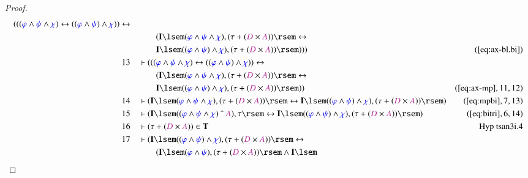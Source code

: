\begin{proof}
\begin{align}
     (
      ( ( \mw{\varphi} \wedge \mw{\psi} \wedge \mw{\chi} )
      \leftrightarrow ( ( \mw{\varphi} \wedge \mw{\psi} )
      \wedge \mw{\chi} ) ) \leftrightarrow  \notag \\ & & & \qquad
     ( \mathbf{I}
      \lsem ( \mw{\varphi} \wedge \mw{\psi} \wedge
      \mw{\chi} ) , ( \tau + ( \mc{D} \times \mc{A} ) )
      \rsem \leftrightarrow  \notag \\ & & & \qquad
     \mathbf{I} \lsem ( (
      \mw{\varphi} \wedge \mw{\psi} ) \wedge \mw{\chi} ) ,
      ( \tau + ( \mc{D} \times \mc{A} ) ) \rsem ) )
      )&(\mbox{\ref{eq:ax-bl.bi}})\notag
  \\ 13 &&  & \vdash ( ( ( \mw{\varphi} \wedge \mw{\psi} \wedge \mw{\chi} )
      \leftrightarrow ( ( \mw{\varphi} \wedge \mw{\psi} )
      \wedge \mw{\chi} ) ) \leftrightarrow  \notag \\ & & & \qquad
     ( \mathbf{I}
      \lsem ( \mw{\varphi} \wedge \mw{\psi} \wedge
      \mw{\chi} ) , ( \tau + ( \mc{D} \times \mc{A} ) )
      \rsem \leftrightarrow \notag \\ & & & \qquad
      \mathbf{I} \lsem ( (
      \mw{\varphi} \wedge \mw{\psi} ) \wedge \mw{\chi} ) ,
      ( \tau + ( \mc{D} \times \mc{A} ) ) \rsem )
      )&(\mbox{\ref{eq:ax-mp}},11,12)\notag
  \\ 14 &&  & \vdash ( \mathbf{I} \lsem ( \mw{\varphi} \wedge \mw{\psi} \wedge
      \mw{\chi} ) , ( \tau + ( \mc{D} \times \mc{A} ) )
      \rsem \leftrightarrow \mathbf{I} \lsem ( (
      \mw{\varphi} \wedge \mw{\psi} ) \wedge \mw{\chi} ) ,
      ( \tau + ( \mc{D} \times \mc{A} ) ) \rsem
      )&(\mbox{\ref{eq:mpbi}},7,13)\notag
  \\ 15 &&  & \vdash ( \mathbf{I} \lsem ( ( \mw{\varphi} \wedge \mw{\psi}
      \wedge \mw{\chi} ) ~\string^~ \mc{A} ) , \tau \rsem
      \leftrightarrow \mathbf{I} \lsem ( ( \mw{\varphi}
      \wedge \mw{\psi} ) \wedge \mw{\chi} ) , ( \tau + (
      \mc{D} \times \mc{A} ) ) \rsem
      )&(\mbox{\ref{eq:bitri}},6,14)\notag
  \\ 16 &&  & \vdash ( \tau + ( \mc{D} \times \mc{A} ) ) \in
      \mathbf{T}&\text{Hyp~tsan3i.4}\notag%
  \\ 17 &&  & \vdash ( \mathbf{I} \lsem ( ( \mw{\varphi} \wedge \mw{\psi} )
      \wedge \mw{\chi} ) , ( \tau + ( \mc{D} \times \mc{A} )
      ) \rsem \leftrightarrow \notag \\ & & & \qquad
      ( \mathbf{I} \lsem (
      \mw{\varphi} \wedge \mw{\psi} ) , ( \tau + ( \mc{D}
      \times \mc{A} ) ) \rsem \wedge \mathbf{I} \lsem

\end{align}
\end{proof}
